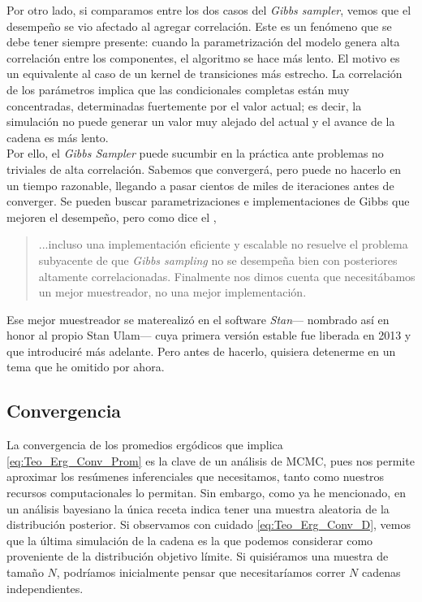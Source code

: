 Por otro lado, si comparamos entre los dos casos del \textit{Gibbs sampler}, vemos que el desempeño se vio afectado al agregar correlación. Este es un fenómeno que se debe tener siempre presente: cuando la parametrización del modelo genera alta correlación entre los componentes, el algoritmo se hace más lento. El motivo es un equivalente al caso de un kernel de transiciones más estrecho. La correlación de los parámetros implica que las condicionales completas están muy concentradas, determinadas fuertemente por el valor actual; es decir, la simulación no puede generar un valor muy alejado del actual y el avance de la cadena es más lento.\\ 

Por ello, el \textit{Gibbs Sampler} puede sucumbir en la práctica ante problemas no triviales de alta correlación. Sabemos que convergerá, pero puede no hacerlo en un tiempo razonable, llegando a pasar cientos de miles de iteraciones antes de converger. Se pueden buscar parametrizaciones e implementaciones de Gibbs que mejoren el desempeño, pero como dice el \textcite{Stan17}, 
\begin{quote}
...incluso una implementación eficiente y escalable no resuelve el problema subyacente de que \textit{Gibbs sampling} no se desempeña bien con posteriores altamente correlacionadas. Finalmente nos dimos cuenta que necesitábamos un mejor muestreador, no una mejor implementación.
\end{quote}

Ese mejor muestreador se materealizó en el software \textit{Stan}--- nombrado así en honor al propio Stan Ulam--- cuya primera versión estable fue liberada en 2013 y que introduciré más adelante. Pero antes de hacerlo, quisiera detenerme en un tema que he omitido por ahora.\\

\subsection{Convergencia}\label{sec:Convergencia}

La convergencia de los promedios ergódicos que implica \eqref{eq:Teo_Erg_Conv_Prom} es la clave de un análisis de MCMC, pues nos permite aproximar los resúmenes inferenciales que necesitamos, tanto como nuestros recursos computacionales lo permitan. Sin embargo, como ya he mencionado, en un análisis bayesiano la única receta indica tener una muestra aleatoria de la distribución posterior. Si observamos con cuidado \eqref{eq:Teo_Erg_Conv_D}, vemos que la última simulación de la cadena es la que podemos considerar como proveniente de la distribución objetivo límite. Si quisiéramos una muestra de tamaño $N$, podríamos inicialmente pensar que necesitaríamos correr $N$ cadenas independientes.\\ 

